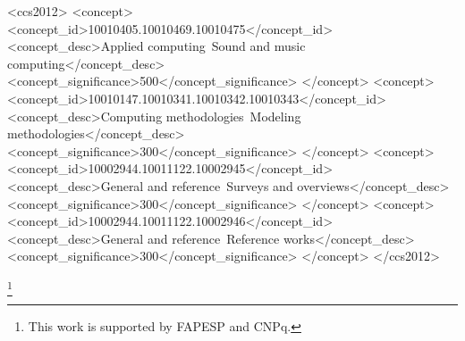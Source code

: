 \documentclass[format=acmsmall, review=false, screen=true]{acmart}
\begin{document}
%
%
\begin{CCSXML}
  <ccs2012>
    <concept>
      <concept_id>10010405.10010469.10010475</concept_id>
      <concept_desc>Applied computing~Sound and music computing</concept_desc>
      <concept_significance>500</concept_significance>
    </concept>
    <concept>
      <concept_id>10010147.10010341.10010342.10010343</concept_id>
      <concept_desc>Computing methodologies~Modeling methodologies</concept_desc>
      <concept_significance>300</concept_significance>
    </concept>
    <concept>
      <concept_id>10002944.10011122.10002945</concept_id>
      <concept_desc>General and reference~Surveys and overviews</concept_desc>
      <concept_significance>300</concept_significance>
    </concept>
    <concept>
      <concept_id>10002944.10011122.10002946</concept_id>
      <concept_desc>General and reference~Reference works</concept_desc>
      <concept_significance>300</concept_significance>
    </concept>
  </ccs2012>
\end{CCSXML}


%
%




\thanks{This work is supported by FAPESP and CNPq.}


\maketitle

\renewcommand{\shortauthors}{R. Fabbri et al.}


\end{document}

